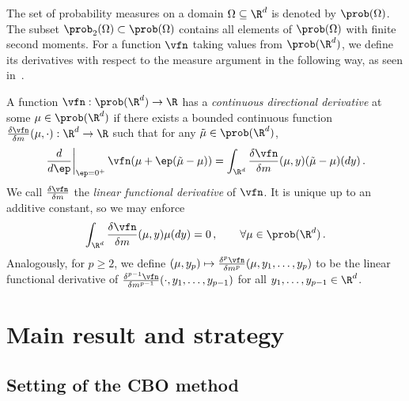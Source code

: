\documentclass{amsart}
\begin{document}
The set of probability measures on a domain $\Omega \subseteq \R^d$ is denoted by $\prob(\Omega)$. 
The subset $\prob_2(\Omega) \subset \prob(\Omega)$ contains all elements of $\prob(\Omega)$ with finite second moments.
For a function $\vfn$ taking values from $\prob(\R^d)$, we define its derivatives with respect to the measure argument in the following way, as seen in~\cite{CardaliaguetDelarueLasryLions2019,CarmonaDelarue2018I}. 
\begin{definition}
	A function $\vfn: \prob(\R^d) \to \R$ has a \emph{continuous directional derivative} at some $\mu \in \prob(\R^d)$ if there exists a bounded continuous function $\frac{\delta \vfn}{\delta m}(\mu, \cdot): \R^d \to \R$ such that 
	for any $\tilde \mu \in \prob(\R^d)$, 
	\begin{equation*}
		\left. \frac{d}{d\ep} \right\vert_{\ep=0^+} \vfn(\mu + \ep(\tilde \mu - \mu)) = \int_{\R^d} \frac{\delta \vfn}{\delta m} (\mu, y) (\tilde \mu - \mu)(dy) \,.
	\end{equation*}
	We call $\frac{\delta \vfn}{\delta m}$ the \emph{linear functional derivative} of $\vfn$. 
	It is unique up to an additive constant, so we may enforce 
	\begin{equation*}
		\int_{\R^d} \frac{\delta \vfn}{\delta m}(\mu, y) \mu(dy) = 0 \,, \qquad \forall \mu \in \prob(\R^d) \,.
	\end{equation*}
	Analogously, for $p \ge 2$, we define $(\mu, y_p) \mapsto \frac{\delta^p \vfn}{\delta m^p}(\mu, y_1,\dots,y_p)$ to be the linear functional derivative of $\frac{\delta^{p-1} \vfn}{\delta m^{p-1}}(\cdot, y_1,\dots,y_{p-1})$ for all $y_1,\dots,y_{p-1} \in \R^d$. 
\end{definition}
 



\section{Main result and strategy}
\label{s:main-result}

\subsection{Setting of the CBO method}
\end{document}

